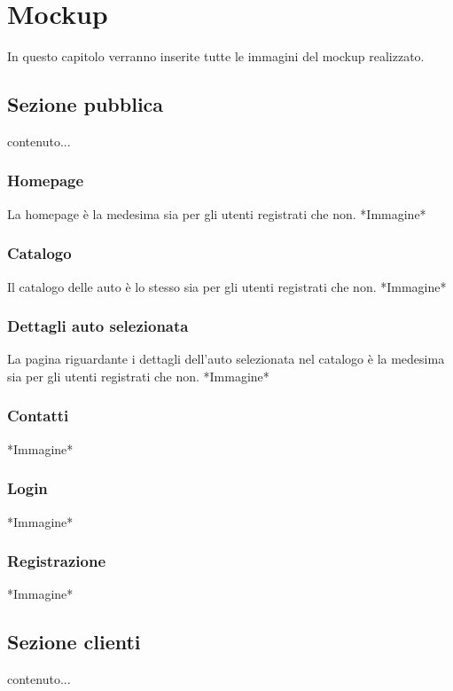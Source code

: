 \documentclass[12pt,a4paperS]{report}
\begin{document}
	\hypertarget{mockup}{\chapter{Mockup}}
	\label{mockup}
	\begin{normalsize}
		In questo capitolo verranno inserite tutte le immagini del mockup realizzato.
		
		\section{Sezione pubblica}
			contenuto...
			
			\subsection{Homepage}
				La homepage è la medesima sia per gli utenti registrati che non.
				\newline
				*Immagine*
				
			\subsection{Catalogo}
				Il catalogo delle auto è lo stesso sia per gli utenti registrati che non.
				\newline
				*Immagine*
			
			\subsection{Dettagli auto selezionata}
				La pagina riguardante i dettagli dell'auto selezionata nel catalogo è la medesima sia per gli utenti registrati che non.
				\newline
				*Immagine*
			
			\subsection{Contatti}
				*Immagine*
			
			\subsection{Login}
				*Immagine*
			
			\subsection{Registrazione}
				*Immagine*
		
		\section{Sezione clienti}
		contenuto...
			

\end{normalsize}
\end{document}
